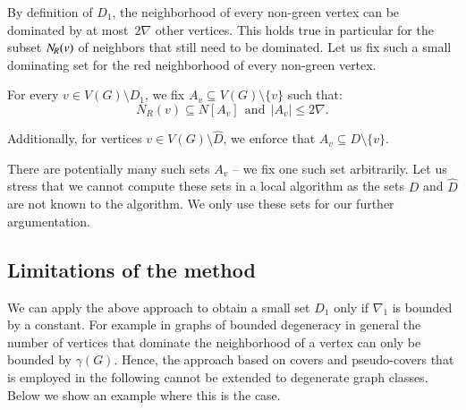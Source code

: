\smallskip By definition of $D_1$, the neighborhood of every non-green
vertex can be dominated by at most~$2\nabla$ other vertices. This holds true
in particular for the subset $N_{\hspace{-1pt}R}(v)$ of neighbors that still need to be
dominated.  Let us fix such a small dominating set for the red
neighborhood of every non-green vertex.

\begin{tcolorbox}
  For every $v\in V(G)\setminus D_1$, we fix
  $A_v\subseteq V(G)\setminus \{v\}$ such that:
    $$N_R(v)\subseteq N[A_v] ~~\text{and}~~ |A_v|\leq 2\nabla.$$

  Additionally, for vertices $v\in V(G)\setminus \hat{D}$, we enforce that
  $A_v\subseteq D\setminus \{v\}$.
\end{tcolorbox}

There are potentially many such sets $A_v$ -- we fix one such set
arbitrarily.
Let us stress that we cannot compute these sets
in a local algorithm as the sets $D$ and $\hat{D}$ are not known
to the algorithm. We only use these sets for our further argumentation.

\subsection{Limitations of the method}

\smallskip
We can apply the above approach to obtain a small set $D_1$ only if $\nabla_1$ is bounded by a constant. For example in graphs of bounded degeneracy in general the number of vertices that dominate the
neighborhood of a vertex can only be bounded by $\gamma(G)$.
Hence, the approach based on covers and pseudo-covers that is employed
in the following cannot be extended to degenerate  graph classes. Below
we show an example where this is the case.


